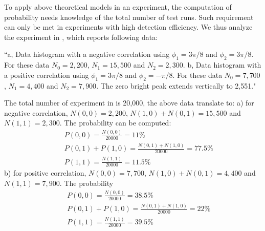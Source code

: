 \documentclass[prd,showpacs,twocolumn]{revtex4-1}
\begin{document}
To apply above theoretical models in an experiment, the computation of probability needs knowledge of the total number of test runs. Such requirement can only be met in experiments with high detection efficiency. We thus analyze the experiment in \cite{Rowe}, which reports following data:

``a, Data histogram with a negative correlation using $\phi_1 = 3\pi/8$ and $\phi_2 = 3\pi/8$. For these data $N_0 = 2,200$, $N_1 = 15,500$ and $N_2 = 2,300$. b, Data histogram with a positive correlation using $\phi_1 = 3\pi/8$ and $\phi_2 = -\pi/8$. For these data $N_0 = 7,700$, $N_1 = 4,400$ and $N_2 = 7,900$. The zero bright peak extends vertically to 2,551."

The total number of experiment in \cite{Rowe} is 20,000, the above data translate to: a) for negative correlation, $N(0,0) = 2,200$, $N(1,0)+N(0,1) = 15,500$ and $N(1,1) = 2,300$. The probability can be computed:
\begin{eqnarray}
&&P(0,0)=\frac{N(0,0)}{20000}=11\%\nonumber\\
&&P(0,1)+P(1,0)=\frac{N(0,1)+N(1,0)}{20000}=77.5\%\nonumber\\
&&P(1,1)=\frac{N(1,1)}{20000}=11.5\%
\label{eqn:PMassive-}
\end{eqnarray}
b) for positive correlation, $N(0,0) = 7,700$, $N(1,0)+N(0,1) = 4,400$ and $N(1,1) = 7,900$. The probability
\begin{eqnarray}
&&P(0,0)=\frac{N(0,0)}{20000}=38.5\%\nonumber\\
&&P(0,1) + P(1,0)=\frac{N(0,1)+N(1,0)}{20000}=22\%\nonumber\\
&&P(1,1)=\frac{N(1,1)}{20000}=39.5\%
\label{eqn:PMassive+}
\end{eqnarray}
\end{document}
